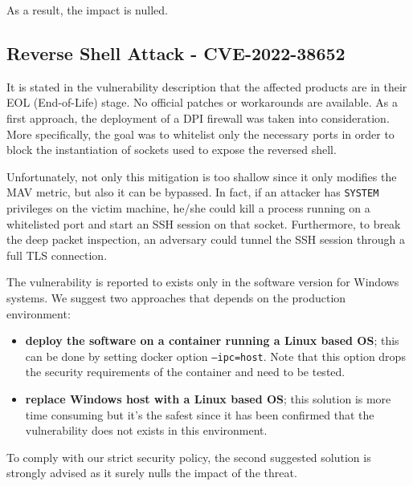 As a result, the impact is nulled.

\subsection*{Reverse Shell Attack - CVE-2022-38652}

It is stated in the vulnerability description that the affected products are in their EOL (End-of-Life) stage. No official patches or workarounds are available. As a first approach, the deployment of a DPI firewall was taken into consideration. More specifically, the goal was to whitelist only the necessary ports in order to block the instantiation of sockets used to expose the reversed shell. 

Unfortunately, not only this mitigation is too shallow since it only modifies the MAV metric, but also it can be bypassed. In fact, if an attacker has \texttt{SYSTEM} privileges on the victim machine, he/she could kill a process running on a whitelisted port and start an SSH session on that socket. Furthermore, to break the deep packet inspection, an adversary could tunnel the SSH session through a full TLS connection.\cite{online:SSH-TLS}

The vulnerability is reported to exists only in the software version for Windows systems. We suggest two approaches that depends on the production environment:

\begin{itemize}
    \item \textbf{deploy the software on a container running a Linux based OS}; this can be done by setting docker option \texttt{--ipc=host}. Note that this option drops the security requirements of the container and need to be tested.
    \item \textbf{replace Windows host with a Linux based OS}; this solution is more time consuming but it's the safest since it has been confirmed that the vulnerability does not exists in this environment.
\end{itemize}

To comply with our strict security policy, the second suggested solution is strongly advised as it surely nulls the impact of the threat.
